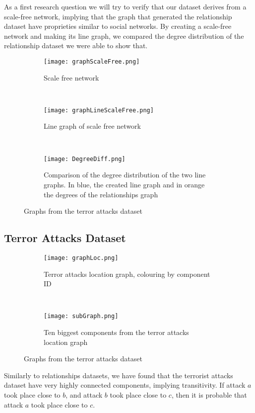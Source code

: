 As a first research question we will try to verify that our dataset derives from a scale-free network, implying that the graph that generated the relationship dataset have proprieties similar to social networks.
By creating a scale-free network and making its line graph, we compared the degree distribution of the relationship dataset we were able to show that.

\begin{figure}[H]
\begin{center}
    \begin{subfigure}[b]{0.30\textwidth}
        \texttt{[image: graphScaleFree.png]}
        \caption{Scale free network}
        \label{fig:Scalefree}
    \end{subfigure}
    ~
    \begin{subfigure}[b]{0.30\textwidth}
        \texttt{[image: graphLineScaleFree.png]}
        \caption{Line graph of scale free network}
        \label{fig:lineG}
    \end{subfigure}
    ~
    \begin{subfigure}[b]{0.30\textwidth}
        \texttt{[image: DegreeDiff.png]}
        \caption{Comparison of the degree distribution of the two line graphs. In blue, the created line graph and in orange the degrees of the relationships graph}
        \label{fig:DegDiff}
    \end{subfigure}
\caption{Graphs from the terror attacks dataset}
\label{fig:RelationshipScaleFree}
\end{center}
\end{figure}



\subsection{Terror Attacks Dataset}
\label{subsec:Terror Attacks Dataset}

\begin{figure}[H]
\begin{center}
    \begin{subfigure}[b]{0.45\textwidth}
        \texttt{[image: graphLoc.png]}
        \caption{Terror attacks location graph, colouring by component ID}
        \label{fig:graphLoc}
    \end{subfigure}
    ~
    \begin{subfigure}[b]{0.45\textwidth}
        \texttt{[image: subGraph.png]}
        \caption{Ten biggest components from the terror attacks location graph}
        \label{fig:subGraph}
    \end{subfigure}
\caption{Graphs from the terror attacks dataset}
\label{fig:graphPlots}
\end{center}
\end{figure}

Similarly to relationships datasets, we have found that the terrorist attacks dataset have very highly connected components, implying transitivity. 
If attack $a$ took place close to $b$, and attack $b$ took place close to $c$, then it is probable that attack $a$ took place close to $c$.
